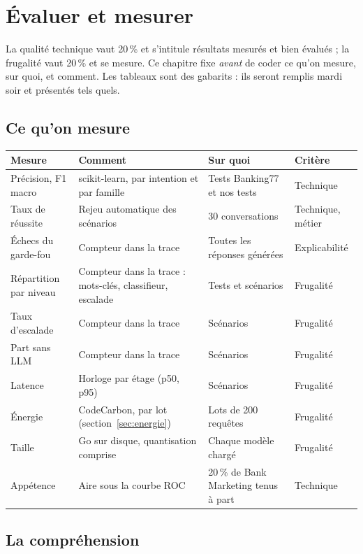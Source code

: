 \chapter{Évaluer et mesurer}
\label{ch:evaluation}

La qualité technique vaut 20\,\% et s'intitule \og résultats mesurés et bien évalués \fg ; la
frugalité vaut 20\,\% et se mesure. Ce chapitre fixe \emph{avant} de coder ce qu'on mesure, sur
quoi, et comment. Les tableaux sont des gabarits : ils seront remplis mardi soir et présentés tels
quels.

\section{Ce qu'on mesure}

\begin{center}\small
\begin{tabularx}{\textwidth}{@{}L{3.6cm} Y L{3.2cm} l@{}}
\toprule
\textbf{Mesure} & \textbf{Comment} & \textbf{Sur quoi} & \textbf{Critère} \\
\midrule
Précision, F1 macro & scikit-learn, par intention et par famille & Tests Banking77 et nos tests &
  Technique \\
Taux de réussite & Rejeu automatique des scénarios & 30 conversations & Technique, métier \\
Échecs du garde-fou & Compteur dans la trace & Toutes les réponses générées & Explicabilité \\
Répartition par niveau & Compteur dans la trace : mots-clés, classifieur, escalade & Tests et
  scénarios & Frugalité \\
Taux d'escalade & Compteur dans la trace & Scénarios & Frugalité \\
Part sans LLM & Compteur dans la trace & Scénarios & Frugalité \\
Latence & Horloge par étage (p50, p95) & Scénarios & Frugalité \\
Énergie & CodeCarbon, par lot (section~\ref{sec:energie}) & Lots de 200 requêtes & Frugalité \\
Taille & Go sur disque, quantisation comprise & Chaque modèle chargé & Frugalité \\
Appétence & Aire sous la courbe ROC & 20\,\% de Bank Marketing tenus à part & Technique \\
\bottomrule
\end{tabularx}
\end{center}

\section{La compréhension}

